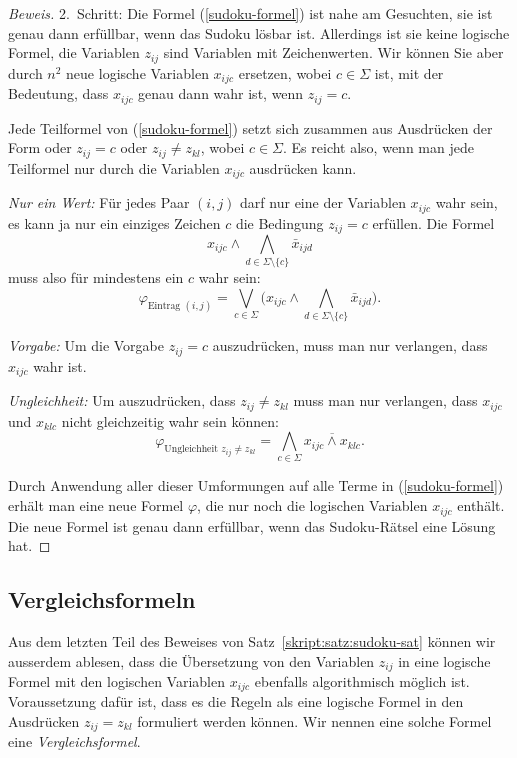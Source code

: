 \begin{proof}[Beweis]
2.~Schritt: Die Formel (\ref{sudoku-formel}) ist nahe am Gesuchten,
sie ist genau dann erfüllbar, wenn das Sudoku lösbar ist. Allerdings
ist sie keine logische Formel, die Variablen $z_{ij}$ sind Variablen mit
Zeichenwerten. Wir können Sie aber durch $n^2$ neue logische Variablen
$x_{ijc}$ ersetzen, wobei $c\in \Sigma$ ist, mit der Bedeutung, dass
$x_{ijc}$ genau dann wahr ist, wenn $z_{ij}=c$. 

Jede Teilformel von (\ref{sudoku-formel}) setzt sich zusammen
aus Ausdrücken der Form oder $z_{ij}=c$
oder $z_{ij}\ne z_{kl}$, wobei $c\in\Sigma$.
Es reicht also, wenn man jede Teilformel nur durch die Variablen $x_{ijc}$ 
ausdrücken kann.
\begin{compactenum}
\item {\em Nur ein Wert:} Für jedes Paar $(i,j)$ darf nur eine der
Variablen $x_{ijc}$ wahr sein, es kann ja nur ein einziges Zeichen $c$
die Bedingung $z_{ij}=c$ erfüllen. Die Formel
\[
x_{ijc}\wedge \bigwedge_{d\in\Sigma\setminus\{c\}}\bar x_{ijd}
\]
muss also für mindestens ein $c$ wahr sein:
\[
\varphi_{\text{Eintrag $(i,j)$}}
=
\bigvee_{c\in \Sigma}
\biggl(
x_{ijc}\wedge \bigwedge_{d\in\Sigma\setminus\{c\}}\bar x_{ijd}
\biggr).
\]
\item {\em Vorgabe:} Um die Vorgabe $z_{ij}=c$ auszudrücken, muss man
nur verlangen, dass $x_{ijc}$ wahr ist.
\item {\em Ungleichheit:} Um auszudrücken, dass $z_{ij} \ne z_{kl}$ muss
man nur verlangen, dass $x_{ijc}$ und $x_{klc}$ nicht gleichzeitig wahr
sein können:
\[
\varphi_{\text{Ungleichheit $z_{ij}\ne z_{kl}$}}
=
\bigwedge_{c\in\Sigma}
\overline{x_{ijc}\wedge x_{klc}}.
\]
\end{compactenum}
Durch Anwendung aller dieser Umformungen auf alle Terme in (\ref{sudoku-formel})
erhält man eine neue Formel $\varphi$, die nur noch die logischen
Variablen $x_{ijc}$ enthält. Die neue Formel ist genau dann erfüllbar,
wenn das Sudoku-Rätsel eine Lösung hat.
\end{proof}

\subsection{Vergleichsformeln}
Aus dem letzten Teil des Beweises von Satz~\ref{skript:satz:sudoku-sat}
können wir ausserdem ablesen, dass die Übersetzung von den Variablen $z_{ij}$
in eine logische Formel mit den logischen Variablen $x_{ijc}$ ebenfalls
algorithmisch möglich ist.
Voraussetzung dafür ist, dass es die Regeln als eine logische Formel
in den Ausdrücken $z_{ij}=z_{kl}$ formuliert werden können.
Wir nennen eine solche Formel eine {\em Vergleichsformel}.

